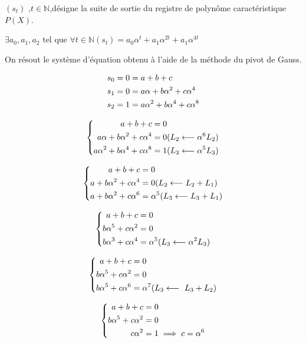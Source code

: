\documentclass[a4paper,10pt]{article}
\newcommand{\N}{\mathbb{N}}
\begin{document}
\begin{enumerate}
$(s_t)$ ,$t \in \N$,désigne la suite de sortie du registre de polynôme caractéristique $P(X)$.

$\exists a_0, a_1, a_2$ tel que 
$\forall t \in \N (s_t)=a_0\alpha^t+a_1 \alpha^{2t}+a_1 \alpha^{4t}$

On résout le système d'équation obtenu à l'aide de la méthode du pivot de Gauss.

\begin{align}
	s_0 &= 0 = a+b+c \notag \\
	s_1 &= 0 = a\alpha + b \alpha^2 +c \alpha^4 \notag \\
	s_2 &= 1 = a \alpha^2+b \alpha^4 + c \alpha^8 \notag 
\end{align}

\[
	\left\{
	\begin{aligned}	
		a+b+c &= 0\notag \\
	a\alpha + b \alpha^2 +c \alpha^4 &= 0  (L_2\longleftarrow \alpha^6L_2 )\notag \\
	a\alpha^2+b \alpha^4 + c \alpha^8 &= 1(L_3\longleftarrow \alpha^5L_3 )\notag 
		\end{aligned}	
	\right.\]
	
\[
	\left\{
	\begin{aligned}	
		a+b+c &= 0\notag \\
	a + b \alpha^2 +c \alpha^4 &= 0  (L_2\longleftarrow L_2+L_1 )\notag \\
	a+b \alpha^2 + c \alpha^6 &= \alpha^5(L_3\longleftarrow L_3+L_1 )\notag 
		\end{aligned}	
	\right.\]
	
\[
	\left\{
	\begin{aligned}	
		a+b+c &= 0\notag \\
	b \alpha^5 +c \alpha^2 &= 0  \notag \\
	b \alpha^3 + c \alpha^4 &= \alpha^5(L_3\longleftarrow \alpha^2L_3 )\notag 
		\end{aligned}	
	\right.\]
	
\[
	\left\{
	\begin{aligned}	
		a+b+c &= 0\notag \\
	b \alpha^5 +c \alpha^2 &= 0  \notag \\
	b \alpha^5 + c \alpha^6 &= \alpha^7(L_3\longleftarrow \ L_3+L_2 )\notag 
		\end{aligned}	
	\right.\]	
	
\[
	\left\{
	\begin{aligned}	
		a+b+c &= 0\notag \\
	b \alpha^5 +c \alpha^2 &= 0  \notag \\
	c \alpha^2 &= 1 \implies c=\alpha^6 \notag 
		\end{aligned}	
	\right.\]		
	

\end{enumerate}
\end{document}
